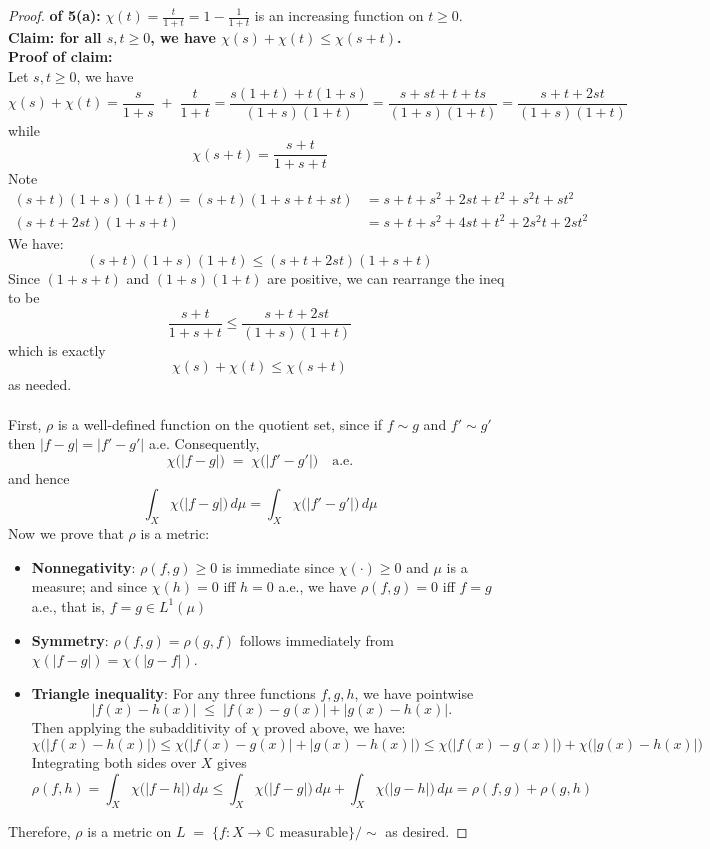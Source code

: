\documentclass[lang=cn,11pt]{elegantbook}
\begin{document}
\begin{proof}
   \textbf{ of 5(a):}
$\chi(t)=\frac{t}{1+t} = 1- \frac{1}{1+t}$ is an increasing function on $t \geq 0$.\\
\textbf{Claim: for all $s,t \geq 0$, we have $ \chi(s) + \chi(t)  \leq \chi(s+t)$.}\\
\textbf{Proof of claim: }\\
Let $s,t \geq 0$, we have
\[
   \chi(s) + \chi(t) =
   \frac{s}{1+s} \;+\; \frac{t}{1+t} =
   \frac{s(1+t) + t(1+s)}{(1+s)(1+t)} =
   \frac{s + st + t + ts}{(1+s)(1+t)} = 
   \frac{s + t + 2st}{(1+s)(1+t)}
\]
while
\[\chi(s+t) =
   \frac{s+t}{1 + s + t}
\]
Note
\begin{align}
        (s+t)(1+s)(1+t)  = (s+t)(1 + s + t + st) &=  s + t + s^2 + 2st + t^2 + s^2t + st^2\\
          (s+t + 2st)(1 + s + t) &=s + t + s^2 + 4st+ t^2 + 2s^2t + 2st^2
\end{align}
We have: \[
  (s+t)(1+s)(1+t) \leq   (s+t + 2st)(1 + s + t)
\]
Since $(1 + s + t)$ and $(1+s)(1+t)$ are positive, we can rearrange the ineq to be  \[
   \frac{s+t}{1+s+t} \leq
   \frac{s+t+2st}{(1+s)(1+t)}
\] which is exactly \[   \chi(s) + \chi(t)  \leq \chi(s+t)\]
as needed.\\\\
First, $\rho$ is a well-defined function on the quotient set, since if \(f \sim g\) and \(f' \sim g'\) then \(|f-g| = |f'-g'|\) a.e. Consequently,
\[
   \chi\bigl(|f-g|\bigr) \;=\; \chi\bigl(|f' - g'|\bigr)
   \quad \text{a.e.}
\]and hence \[
   \int_X \chi\bigl(|f-g|\bigr)\,d\mu  = 
   \int_X \chi\bigl(|f' - g'|\bigr)\,d\mu
\]
Now we prove that \(\rho\) is a metric:
\begin{itemize}
    \item \textbf{Nonnegativity}: \(\rho(f,g) \ge 0\) is immediate since \(\chi(\cdot)\ge0\) and \(\mu\) is a measure; and since $\chi(h) = 0 $ iff $h=0$ a.e., we have \(\rho(f,g) = 0\) iff $f = g$ a.e., that is, $f = g \in L^1(\mu)$
    \item \textbf{Symmetry}: \(\rho(f,g)=\rho(g,f)\) follows immediately from \(\chi(|f-g|) = \chi(|g-f|)\).
    \item \textbf{Triangle inequality}:    For any three functions \(f,g,h\), we have pointwise \[
     |f(x)-h(x)| 
     \;\le\;
     |f(x)-g(x)| + |g(x)-h(x)|.
   \]
   Then applying the subadditivity of \(\chi\) proved above, we have: \[
     \chi\bigl(|f(x)-h(x)|\bigr)  \leq 
     \chi\bigl(|f(x)-g(x)| + |g(x)-h(x)|\bigr) \leq 
     \chi\bigl(|f(x)-g(x)|\bigr)  +
     \chi\bigl(|g(x)-h(x)|\bigr)
   \]
   Integrating both sides over \(X\) gives  \[
     \rho(f,h)  =
     \int_X \chi\bigl(|f-h|\bigr)\,d\mu \leq 
     \int_X \chi\bigl(|f-g|\bigr)\,d\mu  +
     \int_X \chi\bigl(|g-h|\bigr)\,d\mu =
     \rho(f,g) +\rho(g,h)
   \]

\end{itemize} 
Therefore, \(\rho\) is a metric on \( L \;=\; \{f \colon X\to \mathbb{C} \text{ measurable} \}/\!\!\sim\) as desired.
\end{proof}
\end{document}

